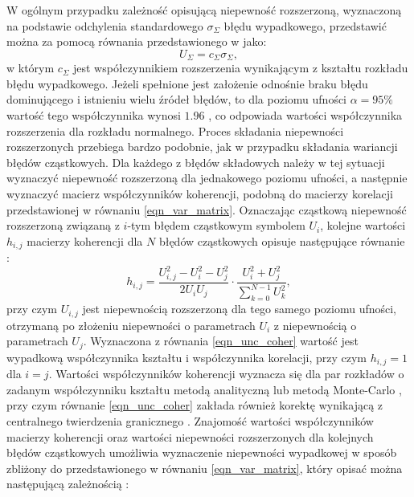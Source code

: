 W ogólnym przypadku zależność opisującą niepewność rozszerzoną, wyznaczoną na podstawie odchylenia standardowego $\sigma_{\Sigma}$ błędu wypadkowego, przedstawić można za pomocą równania przedstawionego w \cite{jcgm_guide} jako:
\begin{equation}
U_{\Sigma} = c_{\Sigma} \sigma_{\Sigma} \label{eqn_unc_sum},
\end{equation}
w którym $c_{\Sigma}$ jest współczynnikiem rozszerzenia wynikającym z kształtu rozkładu błędu wypadkowego. Jeżeli spełnione jest założenie odnośnie braku błędu dominującego i istnieniu wielu źródeł błędów, to dla poziomu ufności $\alpha = 95\%$ wartość tego współczynnika wynosi $1.96$ \cite{jcgm_guide}, co odpowiada wartości współczynnika rozszerzenia dla rozkładu normalnego. Proces składania niepewności rozszerzonych przebiega bardzo podobnie, jak w przypadku składania wariancji błędów cząstkowych. Dla każdego z błędów składowych należy w tej sytuacji wyznaczyć niepewność rozszerzoną dla jednakowego poziomu ufności, a następnie wyznaczyć macierz współczynników koherencji, podobną do macierzy korelacji przedstawionej w równaniu \eqref{eqn_var_matrix}. Oznaczając cząstkową niepewność rozszerzoną związaną z $i$-tym błędem cząstkowym symbolem $U_{i}$, kolejne wartości $h_{i,j}$ macierzy koherencji dla $N$ błędów cząstkowych opisuje następujące równanie \cite{jakubiec_reductive}:
\begin{equation}
h_{i,j} = \frac{U_{i,j}^{2} - U_{i}^{2} - U_{j}^{2}}{2 U_{i} U_{j}} \cdot \frac{U_{i}^{2} + U_{j}^{2}}{\sum _{k = 0} ^{N-1} U_{k}^{2}} \label{eqn_unc_coher},
\end{equation}
przy czym $U_{i,j}$ jest niepewnością rozszerzoną dla tego samego poziomu ufności, otrzymaną po złożeniu niepewności o parametrach $U_{i}$ z niepewnością o parametrach $U_{j}$. Wyznaczona z równania \eqref{eqn_unc_coher} wartość jest wypadkową współczynnika kształtu i współczynnika korelacji, przy czym $h_{i,j} = 1$ dla $i = j$. Wartości współczynników koherencji wyznacza się dla par rozkładów o zadanym współczynniku kształtu metodą analityczną lub metodą Monte-Carlo \cite{jakubiec_arithmetic}, przy czym równanie \eqref{eqn_unc_coher} zakłada również korektę wynikającą z centralnego twierdzenia granicznego \cite{jakubiec_system}. Znajomość wartości współczynników macierzy koherencji oraz wartości niepewności rozszerzonych dla kolejnych błędów cząstkowych umożliwia wyznaczenie niepewności wypadkowej w sposób zbliżony do przedstawionego w równaniu \eqref{eqn_var_matrix}, który opisać można następującą zależnością \cite{jakubiec_reductive}:
